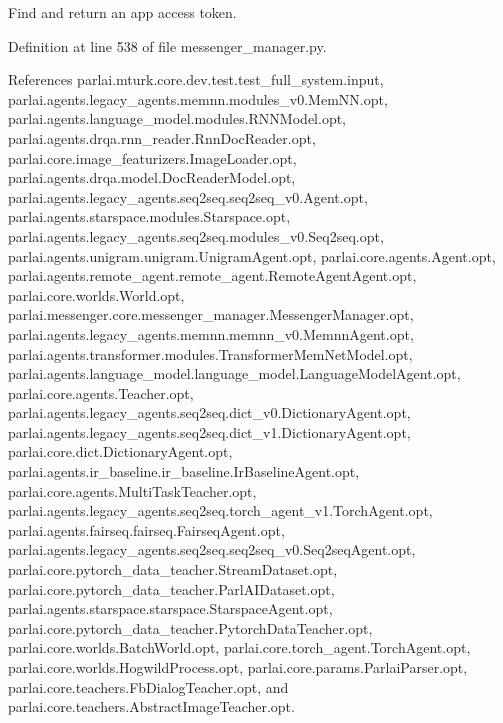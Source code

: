\begin{DoxyVerb}Find and return an app access token.\end{DoxyVerb}
 

Definition at line 538 of file messenger\+\_\+manager.\+py.



References parlai.\+mturk.\+core.\+dev.\+test.\+test\+\_\+full\+\_\+system.\+input, parlai.\+agents.\+legacy\+\_\+agents.\+memnn.\+modules\+\_\+v0.\+Mem\+N\+N.\+opt, parlai.\+agents.\+language\+\_\+model.\+modules.\+R\+N\+N\+Model.\+opt, parlai.\+agents.\+drqa.\+rnn\+\_\+reader.\+Rnn\+Doc\+Reader.\+opt, parlai.\+core.\+image\+\_\+featurizers.\+Image\+Loader.\+opt, parlai.\+agents.\+drqa.\+model.\+Doc\+Reader\+Model.\+opt, parlai.\+agents.\+legacy\+\_\+agents.\+seq2seq.\+seq2seq\+\_\+v0.\+Agent.\+opt, parlai.\+agents.\+starspace.\+modules.\+Starspace.\+opt, parlai.\+agents.\+legacy\+\_\+agents.\+seq2seq.\+modules\+\_\+v0.\+Seq2seq.\+opt, parlai.\+agents.\+unigram.\+unigram.\+Unigram\+Agent.\+opt, parlai.\+core.\+agents.\+Agent.\+opt, parlai.\+agents.\+remote\+\_\+agent.\+remote\+\_\+agent.\+Remote\+Agent\+Agent.\+opt, parlai.\+core.\+worlds.\+World.\+opt, parlai.\+messenger.\+core.\+messenger\+\_\+manager.\+Messenger\+Manager.\+opt, parlai.\+agents.\+legacy\+\_\+agents.\+memnn.\+memnn\+\_\+v0.\+Memnn\+Agent.\+opt, parlai.\+agents.\+transformer.\+modules.\+Transformer\+Mem\+Net\+Model.\+opt, parlai.\+agents.\+language\+\_\+model.\+language\+\_\+model.\+Language\+Model\+Agent.\+opt, parlai.\+core.\+agents.\+Teacher.\+opt, parlai.\+agents.\+legacy\+\_\+agents.\+seq2seq.\+dict\+\_\+v0.\+Dictionary\+Agent.\+opt, parlai.\+agents.\+legacy\+\_\+agents.\+seq2seq.\+dict\+\_\+v1.\+Dictionary\+Agent.\+opt, parlai.\+core.\+dict.\+Dictionary\+Agent.\+opt, parlai.\+agents.\+ir\+\_\+baseline.\+ir\+\_\+baseline.\+Ir\+Baseline\+Agent.\+opt, parlai.\+core.\+agents.\+Multi\+Task\+Teacher.\+opt, parlai.\+agents.\+legacy\+\_\+agents.\+seq2seq.\+torch\+\_\+agent\+\_\+v1.\+Torch\+Agent.\+opt, parlai.\+agents.\+fairseq.\+fairseq.\+Fairseq\+Agent.\+opt, parlai.\+agents.\+legacy\+\_\+agents.\+seq2seq.\+seq2seq\+\_\+v0.\+Seq2seq\+Agent.\+opt, parlai.\+core.\+pytorch\+\_\+data\+\_\+teacher.\+Stream\+Dataset.\+opt, parlai.\+core.\+pytorch\+\_\+data\+\_\+teacher.\+Parl\+A\+I\+Dataset.\+opt, parlai.\+agents.\+starspace.\+starspace.\+Starspace\+Agent.\+opt, parlai.\+core.\+pytorch\+\_\+data\+\_\+teacher.\+Pytorch\+Data\+Teacher.\+opt, parlai.\+core.\+worlds.\+Batch\+World.\+opt, parlai.\+core.\+torch\+\_\+agent.\+Torch\+Agent.\+opt, parlai.\+core.\+worlds.\+Hogwild\+Process.\+opt, parlai.\+core.\+params.\+Parlai\+Parser.\+opt, parlai.\+core.\+teachers.\+Fb\+Dialog\+Teacher.\+opt, and parlai.\+core.\+teachers.\+Abstract\+Image\+Teacher.\+opt.

